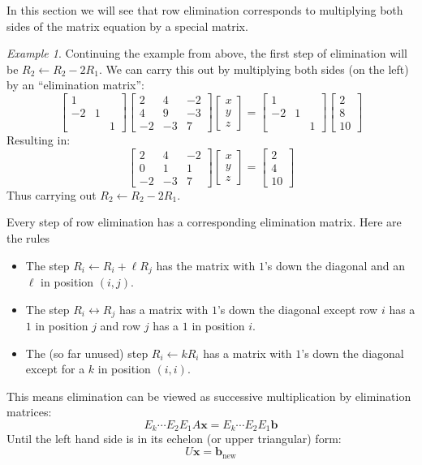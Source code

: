 \documentclass[11pt,oneside]{amsbook}
\theoremstyle{definition}
\theoremstyle{plain}
\theoremstyle{definition}
\theoremstyle{remark}
\newtheorem{example}[theorem]{Example}
\numberwithin{equation}{section}
\numberwithin{figure}{section}
\begin{document}
In this section we will see that row elimination corresponds to multiplying both sides of the matrix equation by a special matrix.

\begin{example}
  Continuing the example from above, the first step of elimination will be $R_2\leftarrow R_2-2R_1$. We can carry this out by multiplying both sides (on the left) by an ``elimination matrix'':
  \[\begin{bmatrix}1&&\\-2&1&\\&&1\end{bmatrix}
    \begin{bmatrix}2&4&-2\\4&9&-3\\-2&-3&7\end{bmatrix}
    \begin{bmatrix}x\\y\\z\end{bmatrix}
    =\begin{bmatrix}1&&\\-2&1&\\&&1\end{bmatrix}
    \begin{bmatrix}2\\8\\10\end{bmatrix}
  \]
  Resulting in:
  \[\begin{bmatrix}2&4&-2\\0&1&1\\-2&-3&7\end{bmatrix}
    \begin{bmatrix}x\\y\\z\end{bmatrix}
    =\begin{bmatrix}2\\4\\10\end{bmatrix}
  \]
  Thus carrying out $R_2\leftarrow R_2-2R_1$.
\end{example}

Every step of row elimination has a corresponding elimination matrix. Here are the rules
\begin{itemize}
  \item The step $R_i\leftarrow R_i+\ell R_j$ has the matrix with $1$'s down the diagonal and an $\ell$ in position $(i,j)$.
  \item The step $R_i\leftrightarrow R_j$ has a matrix with $1$'s down the diagonal except row $i$ has a $1$ in position $j$ and row $j$ has a $1$ in position $i$.
  \item The (so far unused) step $R_i\leftarrow kR_i$ has a matrix with $1$'s down the diagonal except for a $k$ in position $(i,i)$.
\end{itemize}
This means elimination can be viewed as successive multiplication by elimination matrices:
\[E_k\cdots E_2E_1A\mathbf{x}=E_k\cdots E_2E_1\mathbf{b}
\]
Until the left hand side is in its echelon (or upper triangular) form:
\[U\mathbf{x}=\mathbf{b}_{\text{new}}
\]
\end{document}

